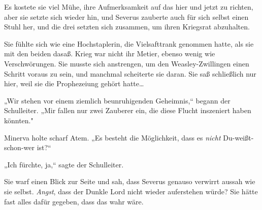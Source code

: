 Es kostete sie viel Mühe, ihre Aufmerksamkeit auf das hier und jetzt zu richten, aber sie setzte sich wieder hin, und Severus zauberte auch für sich selbst einen Stuhl her, und die drei setzten sich zusammen, um ihren Kriegsrat abzuhalten.

Sie fühlte sich wie eine Hochstaplerin, die Vielsafttrank genommen hatte, als sie mit den beiden dasaß. Krieg war nicht ihr Metier, ebenso wenig wie Verschwörungen. Sie musste sich anstrengen, um den Weasley-Zwillingen einen Schritt voraus zu sein, und manchmal scheiterte sie daran. Sie saß schließlich nur hier, weil sie die Prophezeiung gehört hatte…

„Wir stehen vor einem ziemlich beunruhigenden Geheimnis,“ begann der Schulleiter. „Mir fallen nur zwei Zauberer ein, die diese Flucht inszeniert haben könnten."

Minerva holte scharf Atem. „Es besteht die Möglichkeit, dass es \emph{nicht} Du-weißt-schon-wer ist?“

„Ich fürchte, ja,“ sagte der Schulleiter.

Sie warf einen Blick zur Seite und sah, dass Severus genauso verwirrt aussah wie sie selbst. \emph{Angst}, dass der Dunkle Lord nicht wieder auferstehen würde? Sie hätte fast alles dafür gegeben, dass das wahr wäre.

